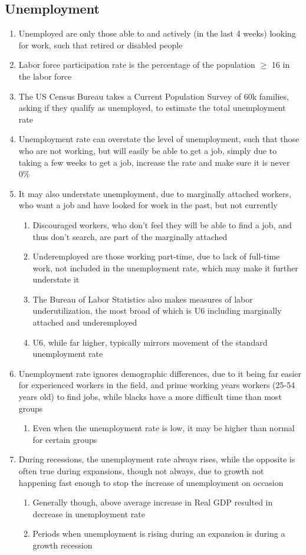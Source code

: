 \documentclass[11 pt, twoside]{article}
\begin{document}
\subsection{Unemployment}
\begin{enumerate}
\item Unemployed are only those able to and actively (in the last 4 weeks) looking for work, such that retired or disabled people
\item Labor force participation rate is the percentage of the population $\geq$ 16 in the labor force
\item The US Census Bureau takes a Current Population Survey of 60k families, asking if they qualify as unemployed, to estimate the total unemployment rate
\item Unemployment rate can overstate the level of unemployment, such that those who are not working, but will easily be able to get a job, simply due to taking a few weeks to get a job, increase the rate and make sure it is never 0\%
\item It may also understate unemployment, due to marginally attached workers, who want a job and have looked for work in the past, but not currently
\begin{enumerate}
\item Discouraged workers, who don't feel they will be able to find a job, and thus don't search, are part of the marginally attached
\item Underemployed are those working part-time, due to lack of full-time work, not included in the unemployment rate, which may make it further understate it
\item The Bureau of Labor Statistics also makes measures of labor underutilization, the most broad of which is U6 including marginally attached and underemployed
\item U6, while far higher, typically mirrors movement of the standard unemployment rate
\end{enumerate}
\item Unemployment rate ignores demographic differences, due to it being far easier for experienced workers in the field, and prime working years workers (25-54 years old) to find jobs, while blacks have a more difficult time than most groups
\begin{enumerate}
\item Even when the unemployment rate is low, it may be higher than normal for certain groups
\end{enumerate}
\item During recessions, the unemployment rate always rises, while the opposite is often true during expansions, though not always, due to growth not happening fast enough to stop the increase of unemployment on occasion
\begin{enumerate}
\item Generally though, above average increase in Real GDP resulted in decrease in unemployment rate
\item Periods when unemployment is rising during an expansion is during a growth recession
\end{enumerate}
\end{enumerate}
\end{document}
